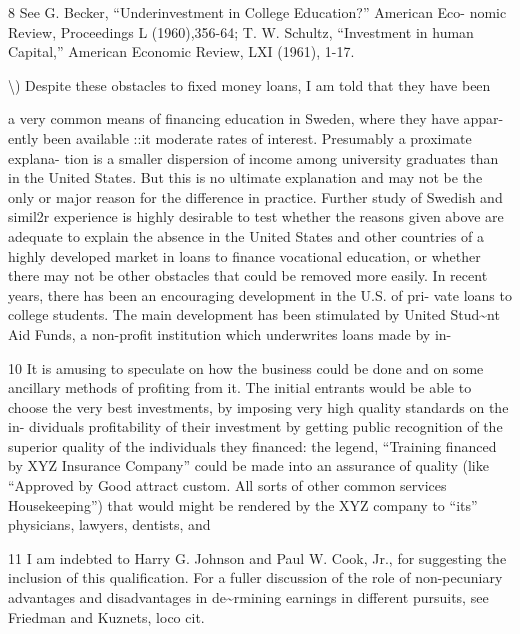 \documentclass[11pt,openany]{book}
\begin{document}
{8 See G. Becker, ``Underinvestment in College Education?'' American Eco- nomic Review, Proceedings L (1960),356-64; T. W. Schultz, ``Investment in human Capital,'' American Economic Review, LXI (1961), 1-17.\par

\textbackslash{}) Despite these obstacles to fixed money loans, I am told that they have been\par

a very common means of financing education in Sweden, where they have appar- ently been available ::it moderate rates of interest. Presumably a proximate explana- tion is a smaller dispersion of income among university graduates than in the United States. But this is no ultimate explanation and may not be the only or major reason for the difference in practice. Further study of Swedish and simil2r experience is highly desirable to test whether the reasons given above are adequate to explain the absence in the United States and other countries of a highly developed market in loans to finance vocational education, or whether there may not be other obstacles that could be removed more easily. In recent years, there has been an encouraging development in the U.S. of pri- vate loans to college students. The main development has been stimulated by United Stud\textasciitilde{}nt Aid Funds, a non-profit institution which underwrites loans made by in-\par

10 It is amusing to speculate on how the business could be done and on some ancillary methods of profiting from it. The initial entrants would be able to choose the very best investments, by imposing very high quality standards on the in- dividuals profitability of their investment by getting public recognition of the superior quality of the individuals they financed: the legend, ``Training financed by XYZ Insurance Company'' could be made into an assurance of quality (like ``Approved by Good attract custom. All sorts of other common services Housekeeping'') that would might be rendered by the XYZ company to ``its'' physicians, lawyers, dentists, and\par

11 I am indebted to Harry G. Johnson and Paul W. Cook, Jr., for suggesting the inclusion of this qualification. For a fuller discussion of the role of non-pecuniary advantages and disadvantages in de\textasciitilde{}rmining earnings in different pursuits, see Friedman and Kuznets, loco cit.\par

}
\end{document}
